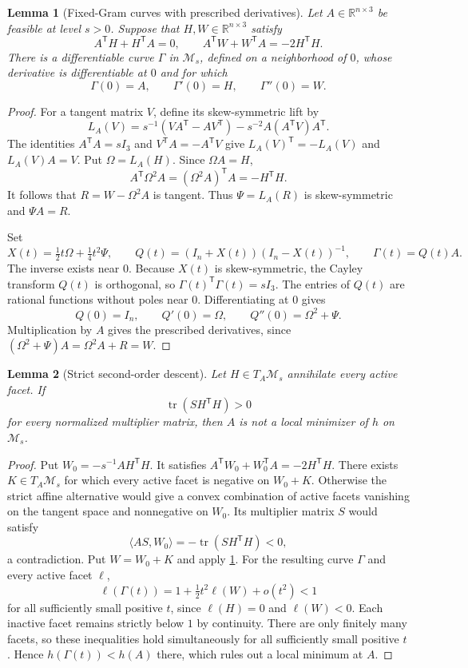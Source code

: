 \documentclass[11pt]{article}
\numberwithin{equation}{section}
\newtheorem{lemma}[lemma]{Lemma}
\theoremstyle{definition}
\theoremstyle{definition}
\newcommand{\R}{\mathbb R}
\DeclareMathOperator{\tr}{tr}
\begin{document}
\begin{lemma}[Fixed-Gram curves with prescribed derivatives]
\label{lem:fixed-gram-jets}
Let $A\in\R^{n\times3}$ be feasible at level $s>0$. Suppose that
$H,W\in\R^{n\times3}$ satisfy
\[
 A^{\mathsf T}H+H^{\mathsf T}A=0,\qquad
 A^{\mathsf T}W+W^{\mathsf T}A=-2H^{\mathsf T}H.
\]
There is a differentiable curve $\Gamma$ in $\mathcal M_s$, defined on
a neighborhood of $0$, whose derivative is differentiable at $0$ and
for which
\[
 \Gamma(0)=A,\qquad \Gamma'(0)=H,\qquad \Gamma''(0)=W.
\]
\end{lemma}
\begin{proof}
For a tangent matrix $V$, define its skew-symmetric lift by
\[
 L_A(V)=s^{-1}(VA^{\mathsf T}-AV^{\mathsf T})
       -s^{-2}A(A^{\mathsf T}V)A^{\mathsf T}.
\]
The identities $A^{\mathsf T}A=sI_3$ and
$V^{\mathsf T}A=-A^{\mathsf T}V$ give
$L_A(V)^{\mathsf T}=-L_A(V)$ and $L_A(V)A=V$.
Put $\Omega=L_A(H)$. Since $\Omega A=H$,
\[
 A^{\mathsf T}\Omega^2A
 = (\Omega^2A)^{\mathsf T}A=-H^{\mathsf T}H.
\]
It follows that $R=W-\Omega^2A$ is tangent. Thus
$\Psi=L_A(R)$ is skew-symmetric and $\Psi A=R$.

Set
\[
 X(t)=\tfrac12t\Omega+\tfrac14t^2\Psi,\qquad
 Q(t)=(I_n+X(t))(I_n-X(t))^{-1},\qquad
 \Gamma(t)=Q(t)A.
\]
The inverse exists near $0$. Because $X(t)$ is skew-symmetric,
the Cayley transform $Q(t)$ is orthogonal, so
$\Gamma(t)^{\mathsf T}\Gamma(t)=sI_3$.
The entries of $Q(t)$ are rational functions without poles near $0$.
Differentiating at $0$ gives
\[
 Q(0)=I_n,\qquad Q'(0)=\Omega,\qquad
 Q''(0)=\Omega^2+\Psi.
\]
Multiplication by $A$ gives the prescribed derivatives, since
$(\Omega^2+\Psi)A=\Omega^2A+R=W$.
\end{proof}

\begin{lemma}[Strict second-order descent]\label{lem:second-order}
Let $H\in T_A\mathcal M_s$ annihilate every active facet.
If
\begin{equation}\label{eq:strict-curvature}
 \tr(SH^{\mathsf T}H)>0
\end{equation}
for every normalized multiplier matrix, then $A$ is not a local minimizer
of $h$ on $\mathcal M_s$.
\end{lemma}
\begin{proof}
Put $W_0=-s^{-1}AH^{\mathsf T}H$. It satisfies
$A^{\mathsf T}W_0+W_0^{\mathsf T}A=-2H^{\mathsf T}H$.
There exists $K\in T_A\mathcal M_s$ for which every active facet is
negative on $W_0+K$. Otherwise the strict affine alternative would give
a convex combination of active facets vanishing on the tangent space
and nonnegative on $W_0$. Its multiplier matrix $S$ would satisfy
\[
 \langle AS,W_0\rangle=-\tr(SH^{\mathsf T}H)<0,
\]
a contradiction. Put $W=W_0+K$ and apply
\cref{lem:fixed-gram-jets}. For the resulting curve $\Gamma$ and every
active facet $\ell$,
\[
 \ell(\Gamma(t))
 =1+\tfrac12t^2\ell(W)+o(t^2)<1
\]
for all sufficiently small positive $t$, since $\ell(H)=0$ and
$\ell(W)<0$. Each inactive facet remains strictly below $1$ by
continuity. There are only finitely many facets, so these inequalities
hold simultaneously for all sufficiently small positive $t$. Hence
$h(\Gamma(t))<h(A)$ there, which rules out a local minimum at $A$.
\end{proof}
\end{document}
